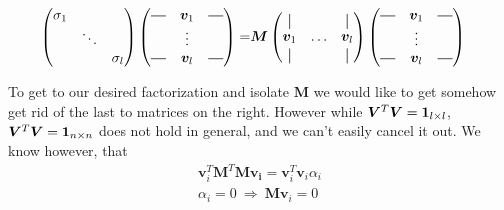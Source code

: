 \begin{align}
\begin{pmatrix}
        \sigma_1 &        &          \\
                 & \ddots &          \\ 
                 &        & \sigma_l
    \end{pmatrix}
    \begin{pmatrix}
        \horzbar & \bm{v}_1 & \horzbar \\
                  & \vdots   &  \\
        \horzbar & \bm{v}_l &  \horzbar \\
    \end{pmatrix} 
    =&
    \bm{M}
    \begin{pmatrix}
    \vertbar &        & \vertbar \\
    \bm{v}_1 & \hdots & \bm{v}_l \\
    \vertbar &        & \vertbar 
    \end{pmatrix}
    \begin{pmatrix}
        \horzbar & \bm{v}_1 & \horzbar \\
                  & \vdots   &  \\
        \horzbar & \bm{v}_l &  \horzbar \\
    \end{pmatrix} 
\end{align}

To get to our desired factorization and isolate $\bm{M}$ we would like to get somehow get rid of the last to matrices on the right.
However while $\bm{V}^T \bm{V} = \bm{1}_{l \times l}$, $\bm{V}^T \bm{V} = \bm{1}_{n \times n}$ does not hold in general, and we can't easily 
cancel it out.
We know however, that 
\begin{align}
    \bm{v}_i^T \bm{M}^T \bm{M} \bm{v_i} =  \bm{v}_i^T \bm{v}_i \alpha_i \\
    \alpha_i = 0 \ \Rightarrow \ \bm{Mv}_i = 0
\end{align}

